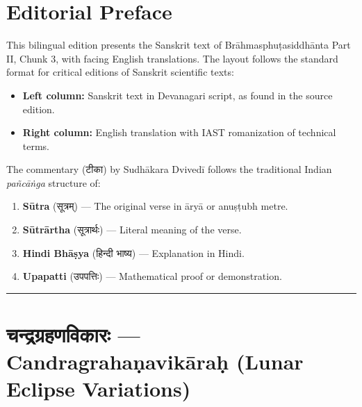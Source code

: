 \documentclass[11pt,a4paper]{article}
\newcommand{\dev}[1]{{\devanagarifont #1}}
\begin{document}
\tableofcontents
\newpage

\section*{Editorial Preface}

This bilingual edition presents the Sanskrit text of Brāhmasphuṭasiddhānta Part II, Chunk 3, with facing English translations. The layout follows the standard format for critical editions of Sanskrit scientific texts:

\begin{itemize}
  \item \textbf{Left column:} Sanskrit text in Devanagari script, as found in the source edition.
  \item \textbf{Right column:} English translation with IAST romanization of technical terms.
\end{itemize}

The commentary (\dev{टीका}) by Sudhākara Dvivedī follows the traditional Indian \emph{pañcāṅga} structure of:
\begin{enumerate}
  \item \textbf{Sūtra} (\dev{सूत्रम्}) — The original verse in āryā or anuṣṭubh metre.
  \item \textbf{Sūtrārtha} (\dev{सूत्रार्थः}) — Literal meaning of the verse.
  \item \textbf{Hindi Bhāṣya} (\dev{हिन्दी भाष्य}) — Explanation in Hindi.
  \item \textbf{Upapatti} (\dev{उपपत्तिः}) — Mathematical proof or demonstration.
\end{enumerate}

\medskip
\noindent\rule{\textwidth}{0.4pt}

\newpage


\section{\texorpdfstring{{\devanagarifont चन्द्रग्रहणविकारः} — Candragrahaṇavikāraḥ (Lunar Eclipse Variations)}{Candragrahaṇavikāraḥ (Lunar Eclipse Variations)}}
\label{sec:chandra-grahana}
\end{document}
